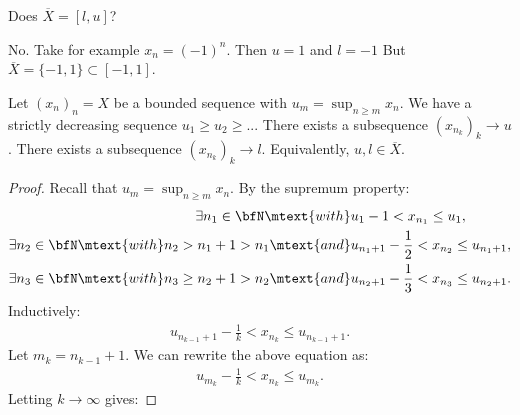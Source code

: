     \begin{question}
        Does $\overline{X} = [l,u]$?
    \end{question}
        \begin{answer}
            No. Take for example $x_n = (-1)^n$. Then $u = 1$ and $l = -1$ But $\overline{X} = \{-1,1\} \subset [-1,1]$.
        \end{answer}

    \begin{proposition}
        Let $(x_n)_n=X$ be a bounded sequence with $u_m = \sup_{n \geq m} x_n$. We have a strictly decreasing sequence $u_1 \geq u_2 \geq ...$ There exists a subsequence $(x_{n_k})_k \rightarrow u$. There exists a subsequence $(x_{n_k})_k \rightarrow l$. Equivalently, $u,l \in \overline{X}$.
    \end{proposition}
        \begin{proof}
            Recall that $u_m = \sup_{n \geq m}x_n$. By the supremum property:
                \begin{equation*}
                \begin{split}
                    \exists n_1 \in \bfN \mtext{with} &u_1-1 < x_{n_1} \leq u_1, \\
                    \exists n_2 \in \bfN \mtext{with} n_2 > n_1 + 1 > n_1 \mtext{and} &u_{n_1 + 1} - \frac{1}{2} < x_{n_2} \leq u_{n_1 + 1}, \\
                    \exists n_3 \in \bfN \mtext{with} n_3 \geq n_2 + 1 > n_2 \mtext{and}& u_{n_2 +1} - \frac{1}{3} < x_{n_3} \leq u_{n_2 + 1}.
                \end{split}
                \end{equation*}
            Inductively:
                \begin{equation*}
                \begin{split}
                    u_{n_{k-1} + 1} - \frac{1}{k} < x_{n_k} \leq u_{n_{k-1} + 1}.
                \end{split}
                \end{equation*}
            Let $m_k = n_{k-1} + 1$. We can rewrite the above equation as:
                \begin{equation*}
                \begin{split}
                    u_{m_k} - \frac{1}{k} < x_{n_k} \leq u_{m_k}.
                \end{split}
                \end{equation*}
            Letting $k\rightarrow \infty$ gives:

\end{proof}
